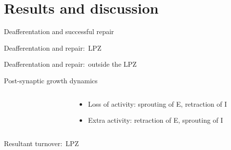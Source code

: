 \section{Results and discussion}
\begin{frame}[c]{Deafferentation and successful repair}
  \begin{figure}
      \centering
      \resizebox{\textwidth}{!}{}%
  \end{figure}
\end{frame}
\begin{frame}[c]{Deafferentation and repair:\ LPZ}
  \begin{figure}
      \centering
      \resizebox{\textwidth}{!}{}%
  \end{figure}
\end{frame}
\begin{frame}[c]{Deafferentation and repair:\ outside the LPZ}
  \begin{figure}
      \centering
      \resizebox{\textwidth}{!}{}%
  \end{figure}
\end{frame}
\begin{frame}[c]{Post-synaptic growth dynamics}
  \begin{columns}
    \begin{column}{0.5\textwidth}
      \begin{figure}[h]
        
      \end{figure}
    \end{column}
    \begin{column}{0.6\textwidth}
      \centering
      \begin{itemize}
        \item Loss of activity: sprouting of E, retraction of I
        \item Extra activity: retraction of E, sprouting of I
      \end{itemize}
    \end{column}
  \end{columns}
\end{frame}
\begin{frame}[c]{Resultant turnover:\ LPZ}
  \begin{figure}[t]
    \centering
    \resizebox{0.6\textwidth}{!}{}\\%
    \resizebox{0.6\textwidth}{!}{}\\%
    \resizebox{0.6\textwidth}{!}{}%
  \end{figure}
\end{frame}
